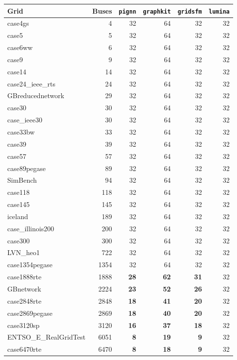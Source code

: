 \documentclass[10pt]{article}
\begin{document}
\begin{table}[H]
\centering\small
\begin{tabular}{lr rrrr}
\toprule
Grid & Buses & \texttt{pignn} & \texttt{graphkit} & \texttt{gridsfm} & \texttt{lumina} \\
\midrule
case4gs & 4 & 32 & 64 & 32 & 32 \\
case5 & 5 & 32 & 64 & 32 & 32 \\
case6ww & 6 & 32 & 64 & 32 & 32 \\
case9 & 9 & 32 & 64 & 32 & 32 \\
case14 & 14 & 32 & 64 & 32 & 32 \\
case24\_ieee\_rts & 24 & 32 & 64 & 32 & 32 \\
GBreducednetwork & 29 & 32 & 64 & 32 & 32 \\
case30 & 30 & 32 & 64 & 32 & 32 \\
case\_ieee30 & 30 & 32 & 64 & 32 & 32 \\
case33bw & 33 & 32 & 64 & 32 & 32 \\
case39 & 39 & 32 & 64 & 32 & 32 \\
case57 & 57 & 32 & 64 & 32 & 32 \\
case89pegase & 89 & 32 & 64 & 32 & 32 \\
SimBench & 94 & 32 & 64 & 32 & 32 \\
case118 & 118 & 32 & 64 & 32 & 32 \\
case145 & 145 & 32 & 64 & 32 & 32 \\
iceland & 189 & 32 & 64 & 32 & 32 \\
case\_illinois200 & 200 & 32 & 64 & 32 & 32 \\
case300 & 300 & 32 & 64 & 32 & 32 \\
LVN\_heo1 & 722 & 32 & 64 & 32 & 32 \\
case1354pegase & 1354 & 32 & 64 & 32 & 32 \\
case1888rte & 1888 & \textbf{28} & \textbf{62} & \textbf{31} & 32 \\
GBnetwork & 2224 & \textbf{23} & \textbf{52} & \textbf{26} & 32 \\
case2848rte & 2848 & \textbf{18} & \textbf{41} & \textbf{20} & 32 \\
case2869pegase & 2869 & \textbf{18} & \textbf{40} & \textbf{20} & 32 \\
case3120sp & 3120 & \textbf{16} & \textbf{37} & \textbf{18} & 32 \\
ENTSO\_E\_RealGridTest & 6051 & \textbf{8} & \textbf{19} & \textbf{9} & 32 \\
case6470rte & 6470 & \textbf{8} & \textbf{18} & \textbf{9} & 32 \\

\end{tabular}
\end{table}
\end{document}
